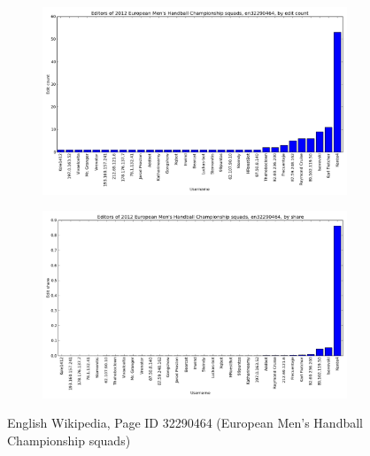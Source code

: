 \begin{figure}
   \centering
    \begin{subfigure}[b]{0.5\linewidth}
      \centering
      \includegraphics[width=\linewidth]{img/editshare/en32290464count.png}
    \end{subfigure}
    \begin{subfigure}[b]{0.5\linewidth}
      \centering
      \includegraphics[width=\linewidth]{img/editshare/en32290464share.png}
    \end{subfigure}
    \caption{English Wikipedia, Page ID 32290464 (European Men's Handball Championship squads)}
\end{figure}
